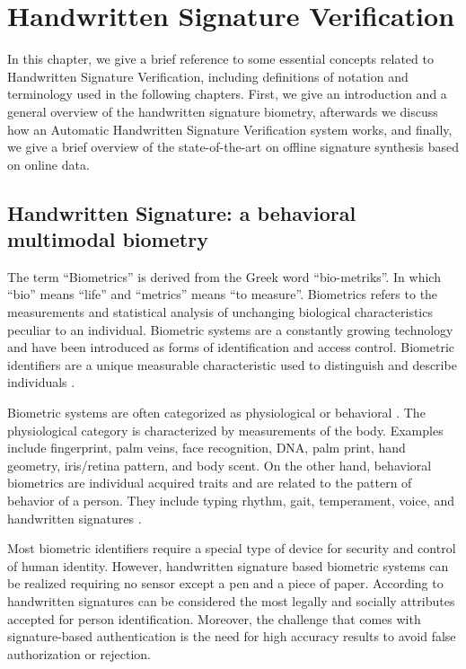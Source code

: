 
\chapter{Handwritten Signature Verification} \label{ch:sig}
In this chapter, we give a brief reference to some essential concepts related to Handwritten Signature Verification, including definitions of notation and terminology used in the following chapters. First, we give an introduction and a general overview of the handwritten signature biometry, afterwards we discuss how an Automatic Handwritten Signature Verification system works, and finally, we give a brief overview of the state-of-the-art on offline signature synthesis based on online data.

\section{Handwritten Signature: a behavioral multimodal biometry}

The term ``Biometrics'' is derived from the Greek word ``bio-metriks''. In which ``bio'' means ``life'' and ``metrics'' means ``to measure''. Biometrics refers to the measurements and statistical analysis of unchanging biological characteristics peculiar to an individual. Biometric systems are
a constantly growing technology \cite{jain2004biometrics} and have been introduced as forms of identification and access control. Biometric identifiers are a unique measurable characteristic used to distinguish and describe individuals \cite{jain2000biometric}. 

Biometric systems are often categorized as physiological or behavioral \cite{ross2008introduction}. The physiological category is characterized by measurements of the body. Examples include fingerprint, palm veins, face recognition, DNA, palm print, hand geometry, iris/retina pattern, and body scent. On the other hand, behavioral biometrics are individual acquired traits and are related to the pattern of behavior of a person. They include typing rhythm, gait, temperament, voice, and handwritten signatures \cite{jain2016}.

Most biometric identifiers require a special type of device for security and control of human identity. However, handwritten signature based biometric systems can be realized requiring no sensor except a pen and a piece of paper. According to \cite{pal2014signature} handwritten signatures can be considered the most legally and socially attributes accepted for person identification. Moreover, the challenge that comes with signature-based authentication is the need for high accuracy results to avoid false authorization or rejection.

